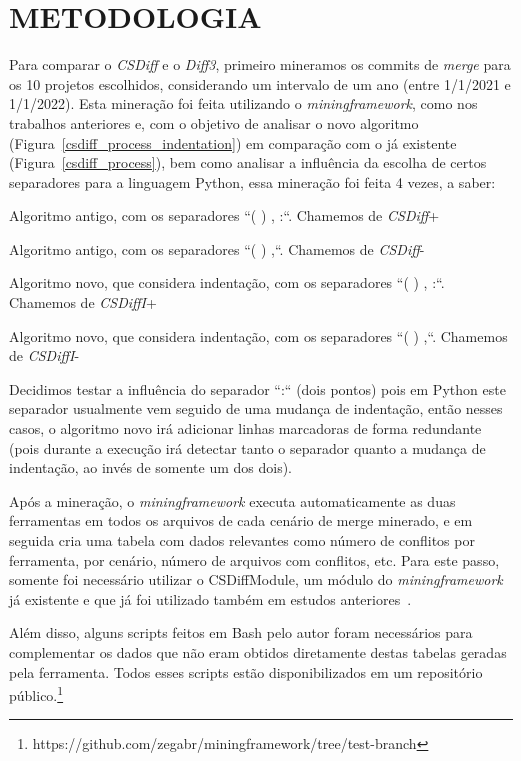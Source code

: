 \section{METODOLOGIA}\label{metodologia}

Para comparar o \emph{CSDiff} e o \emph{Diff3}, primeiro mineramos os commits
de \emph{merge} para os 10 projetos escolhidos, considerando um intervalo de um
ano (entre 1/1/2021 e 1/1/2022). Esta mineração foi feita utilizando o
\emph{miningframework}, como nos trabalhos anteriores e, com o objetivo de analisar o
novo algoritmo (Figura~\ref{csdiff_process_indentation}) em comparação com o já
existente (Figura~\ref{csdiff_process}), bem como analisar a influência da
escolha de certos separadores para a linguagem Python, essa mineração foi feita
4 vezes, a saber:

\begin{compactenum}[(1)]
	\item Algoritmo antigo, com os separadores ``( ) , :``. Chamemos de \emph{CSDiff}+
	\item Algoritmo antigo, com os separadores ``( ) ,``. Chamemos de \emph{CSDiff}-
	\item Algoritmo novo, que considera indentação, com os separadores ``( ) , :``. Chamemos de \emph{CSDiffI}+
	\item Algoritmo novo, que considera indentação, com os separadores ``( ) ,``. Chamemos de \emph{CSDiffI}-
\end{compactenum}

Decidimos testar a influência do separador ``:`` (dois pontos) pois em Python
este separador usualmente vem seguido de uma mudança de indentação, então
nesses casos, o algoritmo novo irá adicionar linhas marcadoras de forma
redundante (pois durante a execução irá detectar tanto o separador quanto a
mudança de indentação, ao invés de somente um dos dois).

Após a mineração, o \emph{miningframework} executa automaticamente as duas
ferramentas em todos os arquivos de cada cenário de merge minerado, e em
seguida cria uma tabela com dados relevantes como número de conflitos por
ferramenta, por cenário, número de arquivos com conflitos, etc. Para este
passo, somente foi necessário utilizar o CSDiffModule, um módulo do
\emph{miningframework} já existente e que já foi utilizado também em estudos
anteriores~\cite{heitor21}.

Além disso, alguns scripts feitos em Bash pelo autor foram necessários para
complementar os dados que não eram obtidos diretamente destas tabelas geradas
pela ferramenta. Todos esses scripts estão disponibilizados em um repositório
público.\footnote{https://github.com/zegabr/miningframework/tree/test-branch} %

